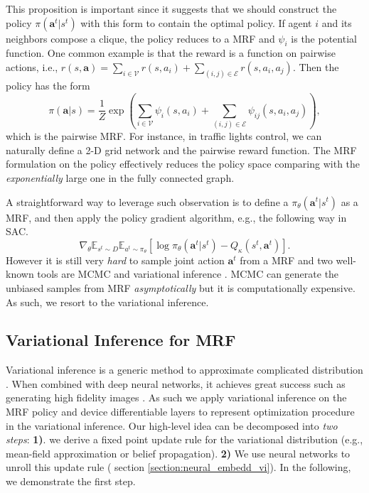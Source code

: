 \documentclass[11pt,a4paper]{article}
\theoremstyle{definition}
\begin{document}
This proposition is important since it suggests that we should construct the policy  $\pi(\mathbf{a}^t|s^t)$ with this form to contain the optimal policy. If  agent $i$ and its neighbors compose a clique, the policy reduces to a MRF and $\psi_i$ is the potential function. One common example is that the reward is a function on pairwise actions, i.e.,  $r(s,\mathbf{a})=\sum_{i\in \mathcal{V}}r(s,a_i)+\sum_{(i,j) \in \mathcal{E}} r(s,a_i,a_j)$. Then the policy has the form $$\pi(\mathbf{a}|s)=\frac{1}{Z}\exp(\sum_{i\in \mathcal{V}}\psi_i(s,a_i) +\sum_{(i,j)\in \mathcal{E}} \psi_{ij}(s,a_i,a_j)),$$ which is the pairwise MRF. For instance, in traffic lights control, we can naturally define a 2-D grid network and the pairwise reward function.  The MRF formulation on the policy effectively reduces the policy space comparing with the \emph{exponentially} large one in the fully connected graph.

A straightforward way to leverage such observation is to define a
$\pi_\theta(\mathbf{a}^t|s^t)$ as a MRF, and then apply the policy gradient algorithm, e.g., the following way in SAC.
$$\nabla_\theta \mathbb{E}_{s^t\sim D}\mathbb{E}_{a^t\sim \pi_\theta}[\log \pi_\theta(\mathbf{a}^t|s^t) -Q_\kappa(s^t,\mathbf{a}^t) ].$$
However it is still very \emph{hard} to sample joint action $\mathbf{a}^t$ from a MRF  and  two well-known tools are MCMC and variational inference \citep{bishop2006pattern}.  MCMC can generate the unbiased samples from MRF \emph{asymptotically} but it is computationally expensive. As such, we resort to the variational inference.

\subsection{Variational Inference for MRF}

Variational inference is a generic method to approximate complicated  distribution \citep{bishop2006pattern}.  When combined with deep neural networks, it achieves great success such as generating high fidelity images \citep{kingma2019introduction,van2017neural}. As such we apply variational inference on the MRF policy and device differentiable layers to represent optimization procedure in the variational inference.   Our high-level idea can be decomposed into \emph{two steps}: \textbf{1)}. we derive a fixed point update rule for the variational distribution (e.g., mean-field approximation or belief propagation). \textbf{2)} We use neural networks to unroll this update rule ( section \ref{section:neural_embedd_vi}). In the following, we  demonstrate the first step.
\end{document}
